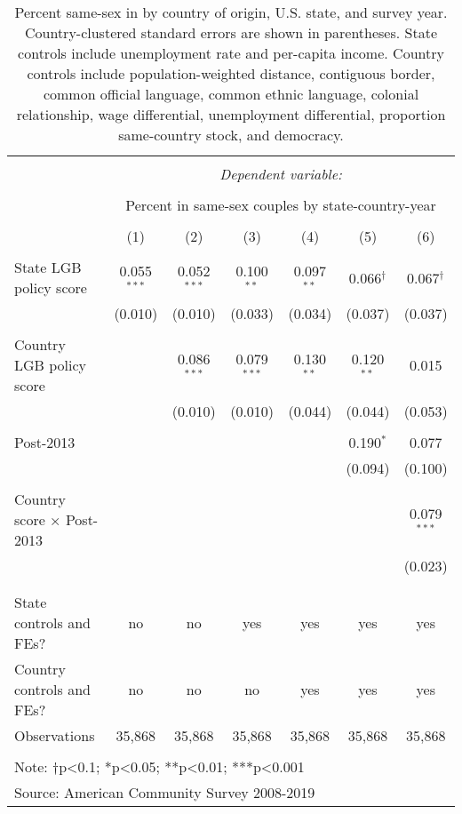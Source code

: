 \documentclass[
  11pt,
]{article}
\begin{document}
\begin{table}[!htbp] \centering 
  \caption{Percent same-sex in by country of origin, U.S. state, and survey year. Country-clustered standard errors are shown in parentheses. State controls include unemployment rate and per-capita income. Country controls include population-weighted distance, contiguous border, common official language, common ethnic language, colonial relationship, wage differential, unemployment differential, proportion same-country stock, and democracy.} 
  \label{tab:state-props} 
\begin{tabular}{@{\extracolsep{5pt}}lcccccc} 
\\[-1.8ex]\hline 
\hline \\[-1.8ex] 
 & \multicolumn{6}{c}{\textit{Dependent variable:}} \\ 
\cline{2-7} 
\\[-1.8ex] & \multicolumn{6}{c}{Percent in same-sex couples by state-country-year} \\ 
\\[-1.8ex] & (1) & (2) & (3) & (4) & (5) & (6)\\ 
\hline \\[-1.8ex] 
 State LGB policy score & 0.055$^{***}$ & 0.052$^{***}$ & 0.100$^{**}$ & 0.097$^{**}$ & 0.066$^{†}$ & 0.067$^{†}$ \\ 
  & (0.010) & (0.010) & (0.033) & (0.034) & (0.037) & (0.037) \\ 
  & & & & & & \\ 
 Country LGB policy score &  & 0.086$^{***}$ & 0.079$^{***}$ & 0.130$^{**}$ & 0.120$^{**}$ & 0.015 \\ 
  &  & (0.010) & (0.010) & (0.044) & (0.044) & (0.053) \\ 
  & & & & & & \\ 
 Post-2013 &  &  &  &  & 0.190$^{*}$ & 0.077 \\ 
  &  &  &  &  & (0.094) & (0.100) \\ 
  & & & & & & \\ 
 Country score × Post-2013 &  &  &  &  &  & 0.079$^{***}$ \\ 
  &  &  &  &  &  & (0.023) \\ 
  & & & & & & \\ 
\hline \\[-1.8ex] 
State controls and FEs? & no & no & yes & yes & yes & yes \\ 
Country controls and FEs? & no & no & no & yes & yes & yes \\ 
Observations & 35,868 & 35,868 & 35,868 & 35,868 & 35,868 & 35,868 \\ 
\hline 
\hline \\[-1.8ex] 
\multicolumn{7}{l}{Note: †p<0.1; *p<0.05; **p<0.01; ***p<0.001} \\ 
\multicolumn{7}{l}{Source: American Community Survey 2008-2019} \\ 
\end{tabular} 
\end{table}
\end{document}
